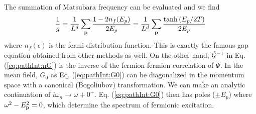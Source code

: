 The summation of Matsubara frequency can be evaluated and we find 
\begin{equation}
\frac{1}{g}=\frac{1}{L^d}\sum_{\mathbf{p}}\frac{1-2n_f(E_p)}{2E_p}=\frac{1}{L^d}\sum_{\mathbf{p}}\frac{\tanh{(E_p/2T)}}{2E_p}
\label{eq:pathInt:gap}
\end{equation}
where $n_f(\epsilon)$ is the fermi distribution function.  This is exactly the famous gap equation obtained from other methods as well.  On the other hand, $\hat{\mathcal{G}}^{-1}$ in Eq. (\ref{eq:pathInt:nG})  is the inverse of the  fermion-fermion correlation of $\Psi$.  In the mean field, $G_{0}$ as Eq. (\ref{eq:pathInt:G0}) can be diagonalized in the momentum space with a canonical (Bogoliubov) transformation.  We can make an analytic continuation of $i\omega_{n}\rightarrow\omega+0^{+}$.  Eq. (\ref{eq:pathInt:G0})  then has poles ($\pm{}E_{p}$) where  $\omega^2-E_{\mathbf{p}}^2=0$,  which determine  the spectrum of fermionic excitation.  

